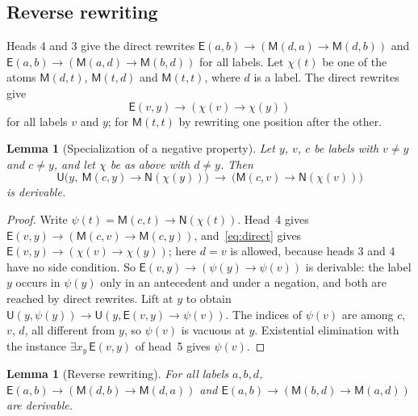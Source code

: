\documentclass[11pt,letterpaper]{article}
\newtheorem{lemma}[theorem]{Lemma}
\newcommand{\Mc}{\mathsf{M}}
\newcommand{\Uc}{\mathsf{U}}
\newcommand{\Ec}{\mathsf{E}}
\newcommand{\Nc}{\mathsf{N}}
\begin{document}
\subsection{Reverse rewriting}

Heads 4 and 3 give the direct rewrites
$\Ec(a,b)\to(\Mc(d,a)\to\Mc(d,b))$ and
$\Ec(a,b)\to(\Mc(a,d)\to\Mc(b,d))$ for all labels. Let $\chi(t)$ be
one of the atoms $\Mc(d,t)$, $\Mc(t,d)$ and $\Mc(t,t)$, where $d$ is a
label. The direct rewrites give
\begin{equation}\label{eq:direct}
 \Ec(v,y)\to(\chi(v)\to\chi(y))
\end{equation}
for all labels $v$ and $y$; for $\Mc(t,t)$ by rewriting one position
after the other.

\begin{lemma}[Specialization of a negative property]\label{lem:spec}
Let $y$, $v$, $c$ be labels with $v\ne y$ and $c\ne y$, and let
$\chi$ be as above with $d\ne y$. Then
\[
 \Uc\bigl(y,\ \Mc(c,y)\to\Nc(\chi(y))\bigr)\ \to\
 \bigl(\Mc(c,v)\to\Nc(\chi(v))\bigr)
\]
is derivable.
\end{lemma}

\begin{proof}
Write $\psi(t)=\Mc(c,t)\to\Nc(\chi(t))$. Head~4 gives
$\Ec(v,y)\to(\Mc(c,v)\to\Mc(c,y))$, and~\eqref{eq:direct} gives
$\Ec(v,y)\to(\chi(v)\to\chi(y))$; here $d=v$ is allowed, because
heads 3 and 4 have no side condition. So
$\Ec(v,y)\to(\psi(y)\to\psi(v))$ is derivable: the label $y$ occurs in
$\psi(y)$ only in an antecedent and under a negation, and both are
reached by direct rewrites. Lift at $y$ to obtain
$\Uc(y,\psi(y))\to\Uc(y,\Ec(v,y)\to\psi(v))$. The indices of
$\psi(v)$ are among $c$, $v$, $d$, all different from $y$, so
$\psi(v)$ is vacuous at $y$. Existential elimination with the instance
$\exists x_y\,\Ec(v,y)$ of head~5 gives $\psi(v)$.
\end{proof}

\begin{lemma}[Reverse rewriting]\label{lem:rev}
For all labels $a,b,d$,
$\Ec(a,b)\to(\Mc(d,b)\to\Mc(d,a))$ and
$\Ec(a,b)\to(\Mc(b,d)\to\Mc(a,d))$ are derivable.
\end{lemma}
\end{document}
